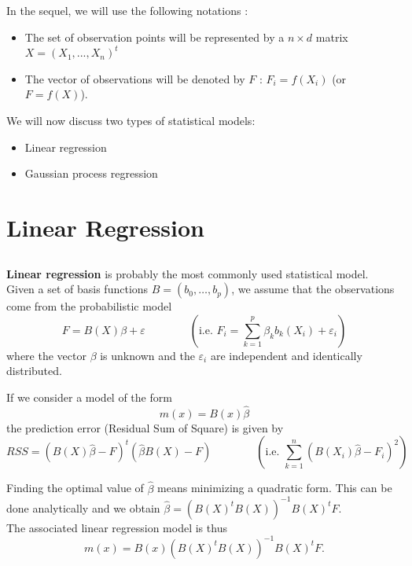 \documentclass{beamer}
\begin{document}
\begin{frame}{}
In the sequel, we will use the following notations : 
\begin{itemize}
	\item The set of observation points will be represented by a $n \times d$ matrix $X=(X_1, ..., X_n)^t$
	\item The vector of observations will be denoted by $F$ : $F_i=f(X_i)$ (or $F=f(X)$).
\end{itemize}
We will now discuss two types of statistical models:
\begin{itemize}
	\item Linear regression
	\item Gaussian process regression
\end{itemize}
\end{frame}

\section{Linear Regression}
\subsection{}

\begin{frame}{}
\textbf{Linear regression} is probably the most commonly used statistical model.\\ \vspace{3mm}
Given a set of basis functions $B=(b_0, \dots, b_p)$, we assume that the observations come from the probabilistic model
$$ F = B(X) \beta  + \varepsilon \qquad \qquad \left( \text{i.e. } F_i = \sum_{k=1}^p \beta_k b_k(X_i) + \varepsilon_i \right) $$
where the vector $\beta$ is unknown and the $\varepsilon_i$ are independent and identically distributed.
\end{frame}

\begin{frame}{}
If we consider a model of the form 
$$m(x) = B(x) \hat{\beta}$$
the prediction error (Residual Sum of Square) is given by 
$$RSS = (B(X) \hat{\beta}  - F)^t(\hat{\beta} B(X) - F)  \qquad \qquad \left( \text{i.e. } \sum_{k=1}^n ( B(X_i) \hat{\beta} - F_i)^2\right)$$ 

Finding the optimal value of $\hat{\beta}$ means minimizing a quadratic form. This can be done analytically and we obtain $\hat{\beta} = (B(X)^t B(X))^{-1} B(X)^t F$.\\
\vspace{3mm}
The associated linear regression model is thus
$$m(x) = B(x) (B(X)^t B(X))^{-1} B(X)^t F.$$
\end{frame}
\end{document}
